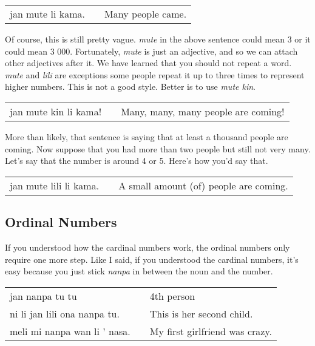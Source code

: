 \begin{supertabular}{p{5,5cm}|ll}
jan mute li kama. && Many people came. \\
\end{supertabular} 

Of course, this is still pretty vague. 
\textit{mute} in the above sentence could mean 3 or it could mean 3 000. 
Fortunately, \textit{mute} is just an adjective, and so we can attach other adjectives after it. 
We have learned that you should not repeat a word. \textit{mute} and \textit{lili} are exceptions some people repeat it up to three times to represent higher numbers. 
This is not a good style. 
Better is to use \textit{mute kin}. 

\begin{supertabular}{p{5,5cm}|ll}
jan mute kin li kama! && Many, many, many people are coming! \\
\end{supertabular} 

More than likely, that sentence is saying that at least a thousand people are coming.  
Now suppose that you had more than two people but still not very many. 
Let's say that the number is around 4 or 5. Here's how you'd say that. 

\begin{supertabular}{p{5,5cm}|ll}
jan mute lili li kama. && A small amount (of) people are coming. \\
\end{supertabular} 
%
%
\subsection*{Ordinal Numbers}
%
%
If you understood how the cardinal numbers work, the ordinal numbers only require one more step. 
Like I said, if you understood the cardinal numbers, it's easy because you just stick \textit{nanpa} in between the noun and the number. 

\begin{supertabular}{p{5,5cm}|ll}
jan nanpa tu tu && 4th person \\
ni li jan lili ona nanpa tu. && This is her second child. \\
meli mi nanpa wan li ' nasa. && My first girlfriend was crazy. \\
\end{supertabular} 
%
%
